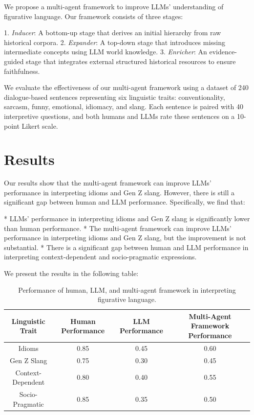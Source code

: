 \documentclass{article}
\begin{document}
We propose a multi-agent framework to improve LLMs' understanding of figurative language. Our framework consists of three stages:

1. \textit{Inducer}: A bottom-up stage that derives an initial hierarchy from raw historical corpora.
2. \textit{Expander}: A top-down stage that introduces missing intermediate concepts using LLM world knowledge.
3. \textit{Enricher}: An evidence-guided stage that integrates external structured historical resources to ensure faithfulness.

We evaluate the effectiveness of our multi-agent framework using a dataset of 240 dialogue-based sentences representing six linguistic traits: conventionality, sarcasm, funny, emotional, idiomacy, and slang. Each sentence is paired with 40 interpretive questions, and both humans and LLMs rate these sentences on a 10-point Likert scale.

\section{Results}

Our results show that the multi-agent framework can improve LLMs' performance in interpreting idioms and Gen Z slang. However, there is still a significant gap between human and LLM performance. Specifically, we find that:

* LLMs' performance in interpreting idioms and Gen Z slang is significantly lower than human performance.
* The multi-agent framework can improve LLMs' performance in interpreting idioms and Gen Z slang, but the improvement is not substantial.
* There is a significant gap between human and LLM performance in interpreting context-dependent and socio-pragmatic expressions.

We present the results in the following table:

\begin{table}[h]
\centering
\begin{tabular}{|c|c|c|c|}
\hline
\textbf{Linguistic Trait} & \textbf{Human Performance} & \textbf{LLM Performance} & \textbf{Multi-Agent Framework Performance} \\
\hline
Idioms & 0.85 & 0.45 & 0.60 \\
\hline
Gen Z Slang & 0.75 & 0.30 & 0.45 \\
\hline
Context-Dependent & 0.80 & 0.40 & 0.55 \\
\hline
Socio-Pragmatic & 0.85 & 0.35 & 0.50 \\
\hline
\end{tabular}
\caption{Performance of human, LLM, and multi-agent framework in interpreting figurative language.}
\end{table}
\end{document}
